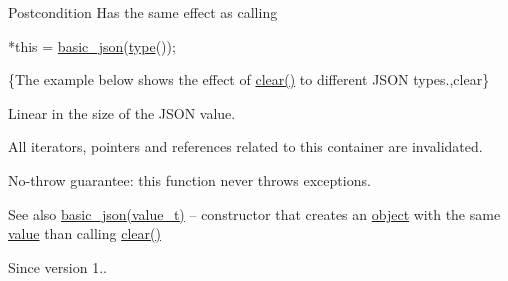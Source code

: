 \begin{DoxyPostcond}{Postcondition}
Has the same effect as calling 
\begin{DoxyCode}
*\textcolor{keyword}{this} = \mbox{\hyperlink{classnlohmann_1_1basic__json_aed115142bd0c6c66c864700e0467df55}{basic\_json}}(\mbox{\hyperlink{classnlohmann_1_1basic__json_a2b2d781d7f2a4ee41bc0016e931cadf7}{type}}());
\end{DoxyCode}

\end{DoxyPostcond}
\{The example below shows the effect of {\ttfamily \mbox{\hyperlink{classnlohmann_1_1basic__json_abfeba47810ca72f2176419942c4e1952}{clear()}}} to different J\+S\+ON types.,clear\}

Linear in the size of the J\+S\+ON value.

All iterators, pointers and references related to this container are invalidated.

No-\/throw guarantee\+: this function never throws exceptions.

\begin{DoxySeeAlso}{See also}
\mbox{\hyperlink{classnlohmann_1_1basic__json_aed115142bd0c6c66c864700e0467df55}{basic\+\_\+json(value\+\_\+t)}} -- constructor that creates an \mbox{\hyperlink{classnlohmann_1_1basic__json_a31f84ee15c4690ff705bed74736d04c6}{object}} with the same \mbox{\hyperlink{classnlohmann_1_1basic__json_adcf8ca5079f5db993820bf50036bf45d}{value}} than calling {\ttfamily \mbox{\hyperlink{classnlohmann_1_1basic__json_abfeba47810ca72f2176419942c4e1952}{clear()}}}
\end{DoxySeeAlso}
\begin{DoxySince}{Since}
version 1.. 
\end{DoxySince}
\mbox{\label{classnlohmann_1_1basic__json_a9286acdc0578fc66e9346323e69fc0e3}} 
